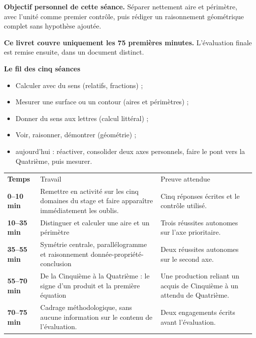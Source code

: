 \documentclass[10pt,a4paper]{article}
\begin{document}
\begin{goalbox}
\textbf{Objectif personnel de cette séance.} Séparer nettement aire et périmètre, avec l'unité comme premier contrôle, puis rédiger un raisonnement géométrique complet sans hypothèse ajoutée.
\par\medskip
\textbf{Ce livret couvre uniquement les 75 premières minutes.} L'évaluation finale est remise ensuite, dans un document distinct.
\end{goalbox}
\begin{methodbox}
\textbf{Le fil des cinq séances}
\begin{itemize}[leftmargin=13mm,labelsep=3mm,itemsep=1.5pt]
\item[\textbf{\color{Navy}S1}] Calculer avec du sens (relatifs, fractions) ;
\item[\textbf{\color{Navy}S2}] Mesurer une surface ou un contour (aires et périmètres) ;
\item[\textbf{\color{Navy}S3}] Donner du sens aux lettres (calcul littéral) ;
\item[\textbf{\color{Navy}S4}] Voir, raisonner, démontrer (géométrie) ;
\item[\textbf{\color{Navy}S5}] aujourd'hui : réactiver, consolider deux axes personnels, faire le pont vers la Quatrième, puis mesurer.
\end{itemize}
\end{methodbox}
\par\noindent\begin{tabularx}{\linewidth}{>{\bfseries}p{20mm} X X}
\rowcolor{Navy}\color{white}Temps & \color{white}Travail & \color{white}Preuve attendue \\
0--10 min & Remettre en activité sur les cinq domaines du stage et faire apparaître immédiatement les oublis. & Cinq réponses écrites et le contrôle utilisé. \\
10--35 min & Distinguer et calculer une aire et un périmètre & Trois réussites autonomes sur l'axe prioritaire. \\
35--55 min & Symétrie centrale, parallélogramme et raisonnement donnée-propriété-conclusion & Deux réussites autonomes sur le second axe. \\
55--70 min & De la Cinquième à la Quatrième : le signe d'un produit et la première équation & Une production reliant un acquis de Cinquième à un attendu de Quatrième. \\
70--75 min & Cadrage méthodologique, sans aucune information sur le contenu de l'évaluation. & Deux engagements écrits avant l'évaluation. \\
\end{tabularx}
\end{document}
